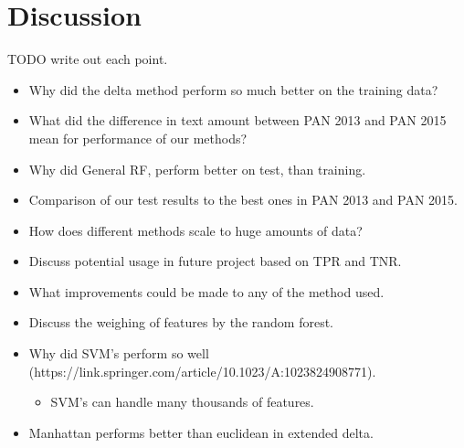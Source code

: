 \section{Discussion}
TODO write out each point.

\begin{itemize}
    \item Why did the delta method perform so much better on the training data?
    \item What did the difference in text amount between PAN 2013 and PAN 2015
        mean for performance of our methods?
    \item Why did General RF, perform better on test, than training.
    \item Comparison of our test results to the best ones in PAN 2013 and PAN
        2015.
    \item How does different methods scale to huge amounts of data?
    \item Discuss potential usage in future project based on TPR and TNR.
    \item What improvements could be made to any of the method used.
    \item Discuss the weighing of features by the random forest.
    \item Why did SVM's perform so well (https://link.springer.com/article/10.1023/A:1023824908771).
        \begin{itemize}
            \item SVM's can handle many thousands of features.
        \end{itemize}
    \item Manhattan performs better than euclidean in extended delta.
\end{itemize}

